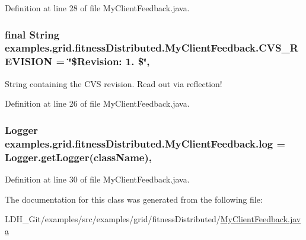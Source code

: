 Definition at line 28 of file My\-Client\-Feedback.\-java.

\hypertarget{classexamples_1_1grid_1_1fitness_distributed_1_1_my_client_feedback_a40d653730a699e8161f020393ba032bb}{
\subsubsection[{C\-V\-S\-\_\-\-R\-E\-V\-I\-S\-I\-O\-N}]{\setlength{\rightskip}{0pt plus 5cm}final String examples.\-grid.\-fitness\-Distributed.\-My\-Client\-Feedback.\-C\-V\-S\-\_\-\-R\-E\-V\-I\-S\-I\-O\-N = \char`\"{}\$Revision\-: 1. \$\char`\"{}\hspace{0.3cm}{\ttfamily [static]}, {\ttfamily [private]}}}\label{classexamples_1_1grid_1_1fitness_distributed_1_1_my_client_feedback_a40d653730a699e8161f020393ba032bb}
String containing the C\-V\-S revision. Read out via reflection! 

Definition at line 26 of file My\-Client\-Feedback.\-java.

\hypertarget{classexamples_1_1grid_1_1fitness_distributed_1_1_my_client_feedback_a5d4c7fe05e29632b59a15b54ccf333f5}{
\subsubsection[{log}]{\setlength{\rightskip}{0pt plus 5cm}Logger examples.\-grid.\-fitness\-Distributed.\-My\-Client\-Feedback.\-log = Logger.\-get\-Logger({\bf class\-Name})\hspace{0.3cm}{\ttfamily [static]}, {\ttfamily [private]}}}\label{classexamples_1_1grid_1_1fitness_distributed_1_1_my_client_feedback_a5d4c7fe05e29632b59a15b54ccf333f5}


Definition at line 30 of file My\-Client\-Feedback.\-java.



The documentation for this class was generated from the following file\-:\begin{DoxyCompactItemize}
\item 
L\-D\-H\-\_\-\-Git/examples/src/examples/grid/fitness\-Distributed/\hyperlink{fitness_distributed_2_my_client_feedback_8java}{My\-Client\-Feedback.\-java}\end{DoxyCompactItemize}
